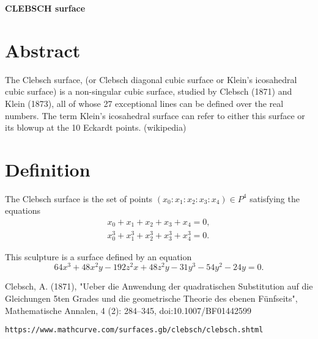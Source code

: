 \documentclass[12pt,dvipdfmx]{article}
\begin{document}
\begin{center}

{\bf \Large CLEBSCH surface}

\end{center}


\section{Abstract}

The Clebsch surface, (or Clebsch diagonal cubic surface or Klein's icosahedral cubic surface) is a non-singular cubic surface, studied by Clebsch (1871)\cite{Clebsch} and Klein (1873), all of whose 27 exceptional lines can be defined over the real numbers. The term Klein's icosahedral surface can refer to either this surface or its blowup at the 10 Eckardt points. (wikipedia)

\section{Definition}

The Clebsch surface is the set of points $(x_0:x_1:x_2:x_3:x_4) \in P^4$ satisfying the equations
\begin{align*}
{ x_{0}+x_{1}+x_{2}+x_{3}+x_{4}=0,}\\
{ x_{0}^{3}+x_{1}^{3}+x_{2}^{3}+x_{3}^{3}+x_{4}^{3}=0.}
\end{align*}

This sculpture is a surface defined by an equation\cite{MathCurve}
\[
64  x^3 + 48  x^2  y- 192  z^2  x + 48  z^2  y
            - 31  y^3 - 54  y^2 - 24  y = 0.
\]

\begin{thebibliography}{9}

 Clebsch, A. (1871), "Ueber die Anwendung der quadratischen Substitution auf die Gleichungen 5ten Grades und die geometrische Theorie des ebenen Fünfseits", Mathematische Annalen, 4 (2): 284–345, doi:10.1007/BF01442599

 \verb|https://www.mathcurve.com/surfaces.gb/clebsch/clebsch.shtml|

\end{thebibliography}
\end{document}
